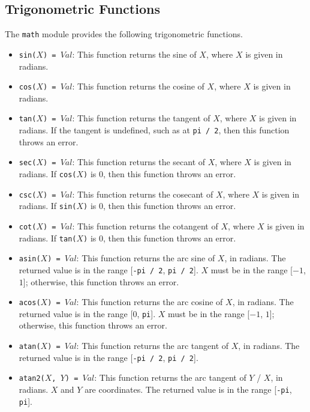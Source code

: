 \subsection{Trigonometric Functions}
The \texttt{math} module provides the following trigonometric functions.
\begin{itemize}
\item \texttt{sin($X$) = $Val$}: This function returns the sine of $X$, where $X$ is given in radians.
\item \texttt{cos($X$) = $Val$}: This function returns the cosine of $X$, where $X$ is given in radians.
\item \texttt{tan($X$) = $Val$}: This function returns the tangent of $X$, where $X$ is given in radians.  If the tangent is undefined, such as at \texttt{pi / 2}, then this function throws an error.
\item \texttt{sec($X$) = $Val$}: This function returns the secant of $X$, where $X$ is given in radians.  If \texttt{cos($X$)} is $0$, then this function throws an error.
\item \texttt{csc($X$) = $Val$}: This function returns the cosecant of $X$, where $X$ is given in radians.  If \texttt{sin($X$)} is $0$, then this function throws an error.
\item \texttt{cot($X$) = $Val$}: This function returns the cotangent of $X$, where $X$ is given in radians.  If \texttt{tan($X$)} is $0$, then this function throws an error.
\item \texttt{asin($X$) = $Val$}: This function returns the arc sine of $X$, in radians.  The returned value is in the range [\texttt{-pi / 2}, \texttt{pi / 2}].  $X$ must be in the range [$-1$, $1$]; otherwise, this function throws an error.
\item \texttt{acos($X$) = $Val$}: This function returns the arc cosine of $X$, in radians.  The returned value is in the range [$0$, \texttt{pi}].  $X$ must be in the range [$-1$, $1$]; otherwise, this function throws an error.
\item \texttt{atan($X$) = $Val$}: This function returns the arc tangent of $X$, in radians.  The returned value is in the range [\texttt{-pi / 2}, \texttt{pi / 2}].
\item \texttt{atan2($X$, $Y$) = $Val$}: This function returns the arc tangent of $Y$ / $X$, in radians.  $X$ and $Y$ are coordinates.  The returned value is in the range [\texttt{-pi}, \texttt{pi}].  

\end{itemize}
